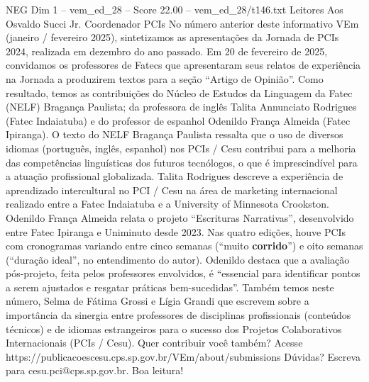 \begin{textsample}{NEG Dim 1 – vem\_ed\_28 – Score 22.00 – vem\_ed\_28/t146.txt}  \label{ex:f1_neg_185}
Leitores Aos Osvaldo Succi Jr.
Coordenador PCIs No número anterior deste informativo VEm (janeiro / fevereiro 2025), sintetizamos as apresentações da Jornada de PCIs 2024, realizada em dezembro do ano passado.
Em 20 de fevereiro de 2025, convidamos os professores de Fatecs que apresentaram seus relatos de experiência na Jornada a produzirem textos para a seção “Artigo de Opinião”.
Como resultado, temos as contribuições do Núcleo de Estudos da Linguagem da Fatec (NELF) Bragança Paulista; da professora de inglês Talita Annunciato Rodrigues (Fatec Indaiatuba) e do professor de espanhol Odenildo França Almeida (Fatec Ipiranga).
O texto do NELF Bragança Paulista ressalta que o uso de diversos idiomas (português, inglês, espanhol) nos PCIs / Cesu contribui para a melhoria das competências linguísticas dos futuros tecnólogos, o que é imprescindível para a atuação profissional globalizada.
Talita Rodrigues descreve a experiência de aprendizado intercultural no PCI / Cesu na área de marketing internacional realizado entre a Fatec Indaiatuba e a University of Minnesota Crookston.
Odenildo França Almeida relata o projeto “Escrituras Narrativas”, desenvolvido entre Fatec Ipiranga e Uniminuto desde 2023.
Nas quatro edições, houve PCIs com cronogramas variando entre cinco semanas (“muito \textbf{corrido}”) e oito semanas (“duração ideal”, no entendimento do autor).
Odenildo destaca que a avaliação pós-projeto, feita pelos professores envolvidos, é “essencial para identificar pontos a serem ajustados e resgatar práticas bem-sucedidas”.
Também temos neste número, Selma de Fátima Grossi e Lígia Grandi que escrevem sobre a importância da sinergia entre professores de disciplinas profissionais (conteúdos técnicos) e de idiomas estrangeiros para o sucesso dos Projetos Colaborativos Internacionais (PCIs / Cesu).
Quer contribuir você também?
Acesse https://publicacoescesu.cps.sp.gov.br/VEm/about/submissions Dúvidas?
Escreva para cesu.pci@cps.sp.gov.br.
Boa leitura!

\end{textsample}

